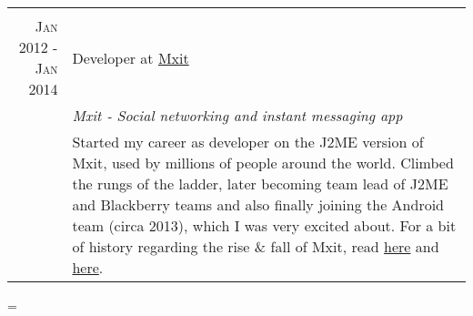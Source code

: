 \documentclass[a4paper,10pt,notitlepage]{article}
\newenvironment{absolutelynopagebreak}
  {\par\nobreak\vfil\penalty0\vfilneg
   \vtop\bgroup}
  {\par\xdef\tpd{\the\prevdepth}\egroup
   \prevdepth=\tpd}
\begin{document}
\begin{absolutelynopagebreak}
\begin{tabular}{r|p{11cm}}
		\multicolumn{2}{c}{} \\
		\textsc{Jan 2012 - Jan 2014} & Developer at \href{www.mxit.com}{Mxit} \\
		                             & \emph{Mxit - Social networking and instant messaging app} \\
		                             & \footnotesize{Started my career as developer on the J2ME version of Mxit, used by millions of people around the world. Climbed the rungs of the ladder, later becoming team lead of J2ME and Blackberry teams and also finally joining the Android team (circa 2013), which I was very excited about. For a bit of history regarding the rise \& fall of Mxit, read \href{https://en.wikipedia.org/wiki/Mxit}{here} and \href{https://www.moneyweb.co.za/news/companies-and-deals/how-did-mxit-go-so-wrong/}{here}.} \\
		
	\end{tabular}
	
\end{absolutelynopagebreak}
\end{document}
